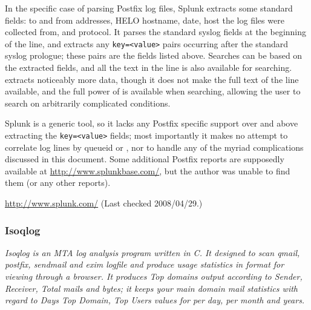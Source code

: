 In the specific case of parsing Postfix log files, Splunk extracts some
standard fields: to and from addresses, HELO hostname, date, host the log
files were collected from, and protocol.  It parses the standard syslog
fields at the beginning of the line, and extracts any \texttt{key=<value>}
pairs occurring after the standard syslog prologue; these pairs are the
fields listed above.  Searches can be based on the extracted fields, and
all the text in the line is also available for searching.  \parsername{}
extracts noticeably more data, though it does not make the full text of the
line available, and the full power of \SQL{} is available when searching,
allowing the user to search on arbitrarily complicated conditions.

Splunk is a generic tool, so it lacks any Postfix specific support over and
above extracting the \texttt{key=<value>} fields; most importantly it makes
no attempt to correlate log lines by queueid or \pid{}, nor to handle any
of the myriad complications discussed in this document.  Some additional
Postfix reports are supposedly available at
\url{http://www.splunkbase.com/}, but the author was unable to find them
(or any other reports).

\url{http://www.splunk.com/} \newline (Last checked 2008/04/29.)

\subsubsection{Isoqlog}

\textit{Isoqlog is an MTA log analysis program written in C. It designed to
scan qmail, postfix, sendmail and exim logfile and produce usage statistics
in \HTML{} format for viewing through a browser. It produces Top domains
output according to Sender, Receiver, Total mails and bytes; it keeps your
main domain mail statistics with regard to Days Top Domain, Top Users
values for per day, per month and years.\/}

